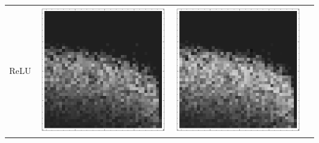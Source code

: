 \documentclass[10pt]{article}
\begin{document}
\begin{tabular}{|c|c|c|c|}
ReLU 
        & \includegraphics[scale=0.25]{plots/simple/LF-20R10R-20T10-CIFAR-1.png}
        & \includegraphics[scale=0.25]{plots/simple/LF-20R10R-20T10-CIFAR-2.png}

\end{tabular}
\end{document}
